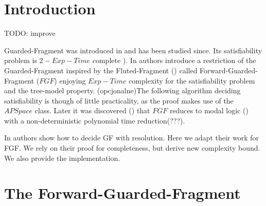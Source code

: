 \documentclass[english, shortabstract]{iithesis}
\author         {Maksymilian Debeściak}
\theoremstyle{definition} \newtheorem{definition}{Definition}[chapter]
\theoremstyle{remark} \newtheorem{remark}[definition]{Observation}
\theoremstyle{plain} \newtheorem{theorem}[definition]{Theorem}
\theoremstyle{plain} \newtheorem{lemma}[definition]{Lemma}
\begin{document}

\chapter{Introduction}
TODO: improve

Guarded-Fragment was introduced in \cite{?} and has been studied since. Its satisfiability problem is $2-Exp-Time$ complete \cite{Gradel1997}).
In \cite{BBE, jelia2021} authors introduce a restriction of the Guarded-Fragment inspired by the Fluted-Fragment (\cite{Fluted}) called Forward-Guarded-Fragment ($FGF$) enjoying $Exp-Time$ complexity for the satisfiability problem and the tree-model property. 
(opcjonalne)The following algorithm deciding satisfiability is though of little practicality, as the proof makes use of the $APSpace$ class.
Later it was discovered (\cite{?}) that $FGF$ reduces to modal logic (\cite{modal logic}) with a non-deterministic polynomial time reduction(???). 
\par In \cite{resolution-gf} authors show how to decide GF with resolution. Here we adapt their work for FGF.
We rely on their proof for completeness, but derive new complexity bound. We also provide the implementation.

\chapter{The Forward-Guarded-Fragment}
\end{document}
